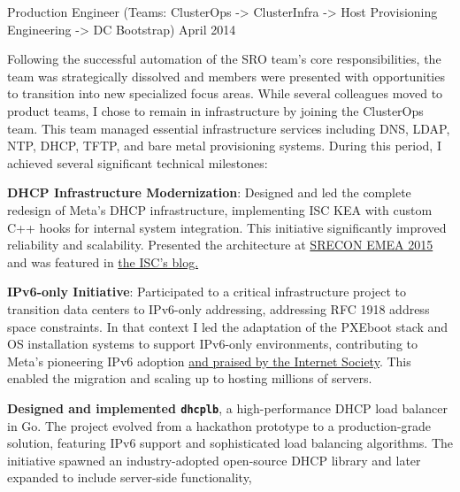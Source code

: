 \begin{cventries}
  \cventryprevrole
  {Production Engineer (Teams: ClusterOps -> ClusterInfra -> Host Provisioning Engineering -> DC Bootstrap)}
  {April 2014 }
  {
    Following the successful automation of the SRO team's core responsibilities, the team was strategically dissolved and
    members were presented with opportunities to transition into new specialized focus areas.
    While several colleagues moved to product teams, I chose to remain in infrastructure by joining the ClusterOps team.
    This team managed essential infrastructure services including DNS, LDAP, NTP, DHCP, TFTP, and bare metal provisioning systems.
    \newline
    During this period, I achieved several significant technical milestones:
    \vspace{2mm}
    \begin{cvitems}
      \item {\textbf{DHCP Infrastructure Modernization}: Designed and led the complete redesign of Meta's DHCP infrastructure,
                  implementing ISC KEA with custom C++ hooks for internal system integration. This initiative
                  significantly improved reliability and scalability. Presented the architecture at \href{https://www.usenix.org/conference/srecon15europe/program/presentation/failla}{SRECON EMEA 2015}
                  and was featured in \href{https://www.isc.org/blogs/how-facebook-is-using-kea-in-the-datacenter/}{the ISC's blog.}}
      \item {\textbf{IPv6-only Initiative}: Participated to a critical infrastructure project to transition
                  data centers to IPv6-only addressing, addressing RFC 1918 address space constraints. In that context I led the
                  adaptation of the PXEboot stack and OS installation systems to support IPv6-only environments, contributing
                  to Meta's pioneering IPv6 adoption \href{https://www.internetsociety.org/resources/deploy360/2014/case-study-facebook-moving-to-an-ipv6-only-internal-network/}{and praised by the Internet Society}.
                  This enabled the migration and scaling up to hosting millions of servers.}
      \item {\textbf{Designed and implemented \texttt{dhcplb}}, a high-performance
                  DHCP load balancer in Go. The project evolved from a hackathon prototype to a production-grade
                  solution, featuring IPv6 support and sophisticated load balancing algorithms. The initiative spawned
                  an industry-adopted open-source DHCP library and later expanded to include server-side functionality,
}
\end{cvitems}}
\end{cventries}
